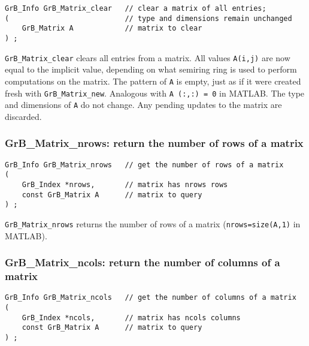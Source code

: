 \documentclass[12pt]{article}
\begin{document}
\begin{mdframed}[userdefinedwidth=6in]
{\footnotesize
\begin{verbatim}
GrB_Info GrB_Matrix_clear   // clear a matrix of all entries;
(                           // type and dimensions remain unchanged
    GrB_Matrix A            // matrix to clear
) ;
\end{verbatim} } \end{mdframed}

\verb'GrB_Matrix_clear' clears all entries from a matrix.  All values
\verb'A(i,j)' are now equal to the implicit value, depending on what semiring
ring is used to perform computations on the matrix.  The pattern of \verb'A' is
empty, just as if it were created fresh with \verb'GrB_Matrix_new'.  Analogous
with \verb'A (:,:) = 0' in MATLAB.  The type and dimensions of \verb'A' do not
change.  Any pending updates to the matrix are discarded.

\subsubsection{{\sf GrB\_Matrix\_nrows:}        return the number of rows of a matrix}
\label{matrix_nrows}

\begin{mdframed}[userdefinedwidth=6in]
{\footnotesize
\begin{verbatim}
GrB_Info GrB_Matrix_nrows   // get the number of rows of a matrix
(
    GrB_Index *nrows,       // matrix has nrows rows
    const GrB_Matrix A      // matrix to query
) ;
\end{verbatim} } \end{mdframed}

\verb'GrB_Matrix_nrows' returns the number of rows of a matrix
(\verb'nrows=size(A,1)' in MATLAB).

\subsubsection{{\sf GrB\_Matrix\_ncols:}        return the number of columns of a matrix}
\label{matrix_ncols}

\begin{mdframed}[userdefinedwidth=6in]
{\footnotesize
\begin{verbatim}
GrB_Info GrB_Matrix_ncols   // get the number of columns of a matrix
(
    GrB_Index *ncols,       // matrix has ncols columns
    const GrB_Matrix A      // matrix to query
) ;
\end{verbatim}
} \end{mdframed}
\end{document}
